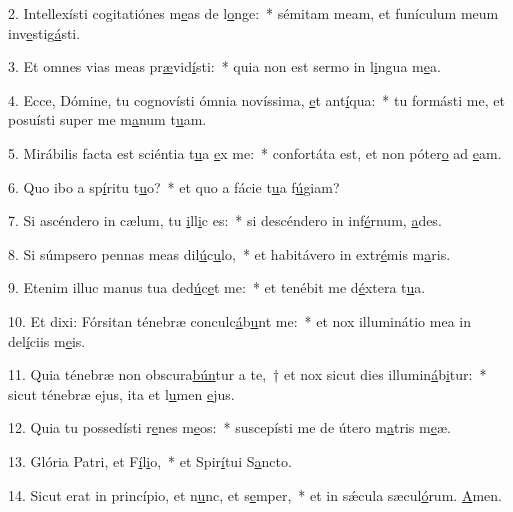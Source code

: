 2. Intellexísti cogitatiónes m\uline{e}as de l\uline{o}nge:~* sémitam meam, et funículum meum inv\uline{e}stig\uline{á}sti.\par 
3. Et omnes vias meas pr\uline{æ}vid\uline{í}sti:~* quia non est sermo in l\uline{i}ngua m\uline{e}a.\par 
4. Ecce, Dómine, tu cognovísti ómnia novíssima, \uline{e}t ant\uline{í}qua:~* tu formásti me, et posuísti super me m\uline{a}num t\uline{u}am.\par 
5. Mirábilis facta est sciéntia t\uline{u}a \uline{e}x me:~* confortáta est, et non póter\uline{o} ad \uline{e}am.\par 
6. Quo ibo a sp\uline{í}ritu t\uline{u}o?~* et quo a fácie t\uline{u}a f\uline{ú}giam?\par 
7. Si ascéndero in cælum, tu \uline{i}ll\uline{i}c es:~* si descéndero in inf\uline{é}rnum, \uline{a}des.\par 
8. Si súmpsero pennas meas dil\uline{ú}c\uline{u}lo,~* et habitávero in extr\uline{é}mis m\uline{a}ris.\par 
9. Etenim illuc manus tua ded\uline{ú}c\uline{e}t me:~* et tenébit me d\uline{é}xtera t\uline{u}a.\par 
10. Et dixi: Fórsitan ténebræ conculc\uline{á}b\uline{u}nt me:~* et nox illuminátio mea in del\uline{í}ciis m\uline{e}is.\par 
11. Quia ténebræ non obscura\uline{bún}tur a te,~† et nox sicut dies illumin\uline{á}b\uline{i}tur:~* sicut ténebræ ejus, ita et l\uline{u}men \uline{e}jus.\par 
12. Quia tu possedísti r\uline{e}nes m\uline{e}os:~* suscepísti me de útero m\uline{a}tris m\uline{e}æ.\par 
13. Glória Patri, et F\uline{í}l\uline{i}o,~* et Spir\uline{í}tui S\uline{a}ncto.\par 
14. Sicut erat in princípio, et n\uline{u}nc, et s\uline{e}mper,~* et in sǽcula sæcul\uline{ó}rum. \uline{A}men.\par 
